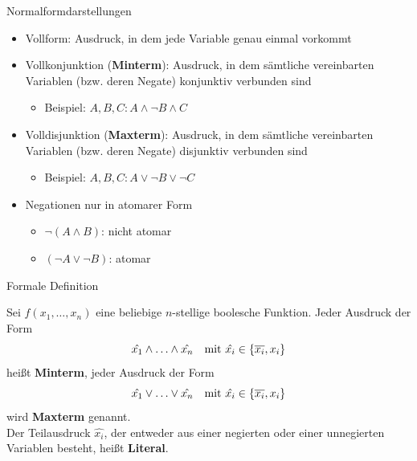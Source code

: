 \documentclass[12pt%
,aspectratio=169%
]{beamer}
\begin{document}
\begin{frame}{Normalformdarstellungen}
\begin{itemize}
	\item Vollform: Ausdruck, in dem jede Variable genau einmal vorkommt 
	\item Vollkonjunktion (\textbf{Minterm}): Ausdruck, in dem sämtliche vereinbarten Variablen (bzw. deren Negate) konjunktiv verbunden sind 
	\begin{itemize}
		\item Beispiel: $A,B,C: A \land \neg B \land C$
	\end{itemize}
	\item Volldisjunktion (\textbf{Maxterm}): Ausdruck, in dem sämtliche vereinbarten Variablen (bzw. deren Negate) disjunktiv verbunden sind
	\begin{itemize}
		\item Beispiel: $A,B,C: A \lor \neg B \lor \neg C$
	\end{itemize}
	\item Negationen nur in atomarer Form
	\begin{itemize}
		\item $\neg(A \land B)$: nicht atomar  
		\item $(\neg A \lor \neg B)$: atomar
	\end{itemize}
\end{itemize}
\end{frame}

\begin{frame}{Formale Definition}
\begin{definition}
Sei $f(x_1 ,\ldots , x_n)$ eine beliebige $n$-stellige boolesche Funktion. Jeder Ausdruck der Form
$$
	\hat{x_1} \land \ldots \land \hat{x_n} \text{\quad mit } \hat{x_i} \in \{\overline{x_i}, x_i\} 
$$
heißt \textbf{Minterm}, jeder Ausdruck der Form
$$
	\hat{x_1} \lor \ldots \lor \hat{x_n} \text{\quad mit } \hat{x_i} \in \{\overline{x_i}, x_i\} 
$$
wird \textbf{Maxterm} genannt.\\
Der Teilausdruck $\hat{x_i}$, der entweder aus einer negierten oder einer unnegierten Variablen besteht, heißt \textbf{Literal}.
\end{definition}
\end{frame}
\end{document}
